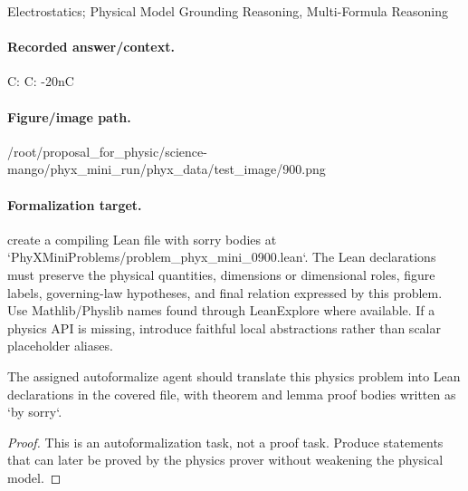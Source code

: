 Electrostatics; Physical Model Grounding Reasoning, Multi-Formula Reasoning

\paragraph{Recorded answer/context.}
C: C: -20nC

\paragraph{Figure/image path.}
/root/proposal\_for\_physic/science-mango/phyx\_mini\_run/phyx\_data/test\_image/900.png

\paragraph{Formalization target.}
create a compiling Lean file with sorry bodies at `PhyXMiniProblems/problem\_phyx\_mini\_0900.lean`. The Lean declarations must preserve the physical quantities, dimensions or dimensional roles, figure labels, governing-law hypotheses, and final relation expressed by this problem.
Use Mathlib/Physlib names found through LeanExplore where available. If a physics API is missing, introduce faithful local abstractions rather than scalar placeholder aliases.

\begin{theorem}
\label{thm:physics:phyx_mini_0900:target}
The assigned autoformalize agent should translate this physics problem into Lean declarations in the covered file, with theorem and lemma proof bodies written as `by sorry`.
\end{theorem}
\begin{proof}
This is an autoformalization task, not a proof task. Produce statements that can later be proved by the physics prover without weakening the physical model.
\end{proof}

